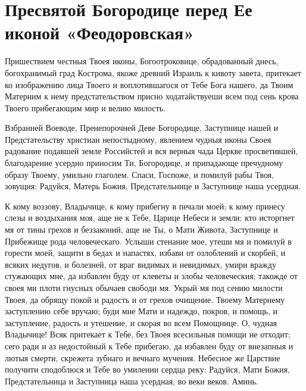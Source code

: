 \section{Пресвятой Богородице перед Ее иконой «Феодоровская»}\begin{mymulticols}




Пришествием честныя Твоея иконы, Богоотроковице, обрадованный днесь, богохранимый град Кострома, якоже древний Израиль к кивоту завета, притекает ко изображению лица Твоего и воплотившагося от Тебе Бога нашего, да Твоим Матерним к нему предстательством присно ходатайствуеши всем под сень крова Твоего прибегающим мир и велию милость.




Взбранней Воеводе, Пренепорочней Деве Богородице, Заступнице нашей и Предстательству христиан непостыдному, явлением чудныя иконы Своея радование подавшей земле Российстей и вся верныя чада Церкве просветившей, благодарение усердно приносим Ти, Богородице, и припадающе пречудному образу Твоему, умильно глаголем. Спаси, Госпоже, и помилуй рабы Твоя, зовущия: Радуйся, Матерь Божия, Предстательнице и Заступнице наша усердная.




К кому воззову, Владычице, к кому прибегну в печали моей; к кому принесу слезы и воздыхания моя, аще не к Тебе, Царице Небеси и земли: кто исторгнет мя от тины грехов и беззаконий, аще не Ты, о Мати Живота, Заступнице и Прибежище рода человеческаго. Услыши стенание мое, утеши мя и помилуй в горести моей, защити в бедах и напастях, избави от озлоблений и скорбей, и всяких недугов, и болезней, от враг видимых и невидимых, умири вражду стужающих мне, да избавлен буду от клеветы и злобы человеческия; такожде от своея ми плоти гнусных обычаев свободи мя. Укрый мя под сению милости Твоея, да обрящу покой и радость и от грехов очищение. Твоему Матернему заступлению себе вручаю; буди мне Мати и надеждо, покров, и помощь, и заступление, радость и утешение, и скорая во всем Помощнице. О, чудная Владычице! Всяк притекает к Тебе, без Твоея всесильныя помощи не отходит; сего ради и аз недостойный к Тебе прибегаю, да избавлен буду от внезапныя и лютыя смерти, скрежета зубнаго и вечнаго мучения. Небесное же Царствие получити сподоблюся и Тебе во умилении сердца реку: Радуйся, Мати Божия, Предстательница и Заступница наша усердная, во веки веков. Аминь.


\end{mymulticols}


